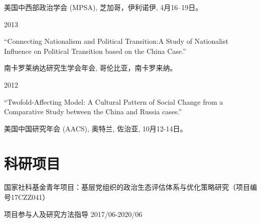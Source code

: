 \documentclass[10.5pt,]{article}
\providecommand{\tightlist}{%
	\setlength{\itemsep}{0pt}\setlength{\parskip}{0pt}}
\renewenvironment{itemize}{
	\begin{list}{}{
			\setlength{\leftmargin}{1.5em}
		}
	}{
	\end{list}
}
\begin{document}
\begin{itemize}
\begin{itemize}
    \begin{itemize}
    \tightlist
    \item
      \footnotesize 美国中西部政治学会 (MPSA), 芝加哥，伊利诺伊,
      4月16--19日。
    \end{itemize}
  \end{itemize}
\item
  2013

  \begin{itemize}
  \tightlist
  \item
    ``Connecting Nationalism and Political Transition:A Study of
    Nationalist Influence on Political Transition based on the China
    Case.''

    \begin{itemize}
    \tightlist
    \item
      \footnotesize 南卡罗莱纳达研究生学会年会, 哥伦比亚，南卡罗来纳。
    \end{itemize}
  \end{itemize}
\item
  2012

  \begin{itemize}
  \tightlist
  \item
    ``Twofold-Affecting Model: A Cultural Pattern of Social Change from
    a Comparative Study between the China and Russia cases.''

    \begin{itemize}
    \tightlist
    \item
      \footnotesize 美国中国研究年会 (AACS), 奥特兰, 佐治亚,
      10月12-14日。
    \end{itemize}
  \end{itemize}
\end{itemize}

\section{科研项目}

\begin{itemize}
\tightlist
\item
  国家社科基金青年项目：基层党组织的政治生态评估体系与优化策略研究（项目编号17CZZ041）

  \begin{itemize}
  \tightlist
  \item
    项目参与人及研究方法指导 \hfill 2017/06-2020/06
  \end{itemize}
\end{itemize}
\end{document}
